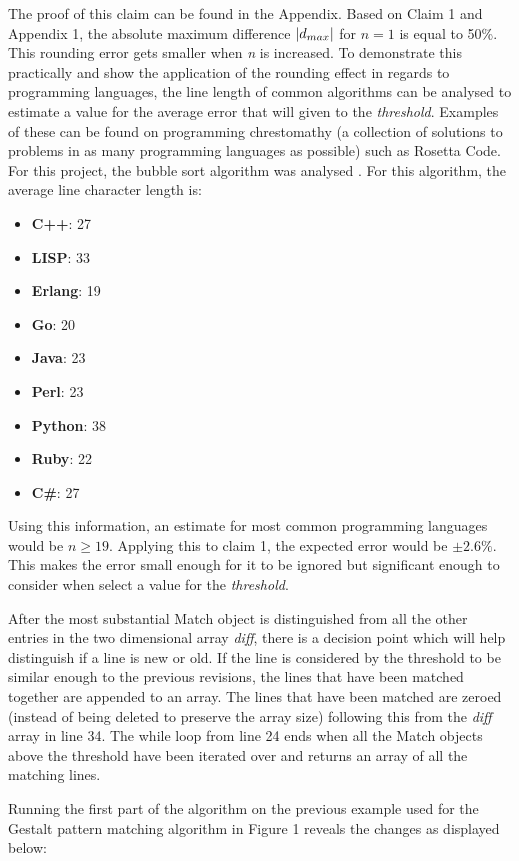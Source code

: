 The proof of this claim can be found in the Appendix. Based on Claim 1 and Appendix 1, the absolute maximum difference $\lvert d_{max}\rvert$ for $n = 1$ is equal to 50\%. This rounding error gets smaller when \textit{n} is increased. To demonstrate this practically and show the application of the rounding effect in regards to programming languages, the line length of common algorithms can be analysed to estimate a value for the average error that will given to the \textit{threshold}. Examples of these can be found on programming chrestomathy (a collection of solutions to problems in as many programming languages as possible) such as Rosetta Code. For this project, the bubble sort algorithm was analysed \citep{rosetta_code_2021}. For this algorithm, the average line character length is:
\begin{itemize}
    \item \textbf{C++}: 27 
    \item \textbf{LISP}: 33 
    \item \textbf{Erlang}: 19 
    \item \textbf{Go}: 20 
    \item \textbf{Java}: 23 
    \item \textbf{Perl}: 23 
    \item \textbf{Python}: 38 
    \item \textbf{Ruby}: 22 
    \item \textbf{C\#}: 27 
\end{itemize}
Using this information, an estimate for most common programming languages would be $n \geq 19$. Applying this to claim 1, the expected error would be $\pm 2.6\%$. This makes the error small enough for it to be ignored but significant enough to consider when select a value for the \textit{threshold}. 

After the most substantial Match object is distinguished from all the other entries in the two dimensional array \textit{diff}, there is a decision point which will help distinguish if a line is new or old. If the line is considered by the threshold to be similar enough to the previous revisions, the lines that have been matched together are appended to an array. The lines that have been matched are zeroed (instead of being deleted to preserve the array size) following this from the \textit{diff} array in line 34. The while loop from line 24 ends when all the Match objects above the threshold have been iterated over and returns an array of all the matching lines.

Running the first part of the algorithm on the previous example used for the Gestalt pattern matching algorithm in Figure 1 reveals the changes as displayed below:

